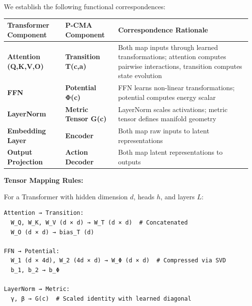 \documentclass[
  11pt,
  a4paper,
]{article}
\begin{document}
We establish the following functional correspondences:

\begin{longtable}[]{@{}
  >{\raggedright\arraybackslash}p{}
  >{\raggedright\arraybackslash}p{}
  >{\raggedright\arraybackslash}p{}@{}}
\toprule\noalign{}
\begin{minipage}[b]{\linewidth}\raggedright
Transformer Component
\end{minipage} & \begin{minipage}[b]{\linewidth}\raggedright
P-CMA Component
\end{minipage} & \begin{minipage}[b]{\linewidth}\raggedright
Correspondence Rationale
\end{minipage} \\
\midrule\noalign{}
\endhead
\bottomrule\noalign{}
\endlastfoot
\textbf{Attention (Q,K,V,O)} & \textbf{Transition T(c,a)} & Both map
inputs through learned transformations; attention computes pairwise
interactions, transition computes state evolution \\
\textbf{FFN} & \textbf{Potential Φ(c)} & FFN learns non-linear
transformations; potential computes energy scalar \\
\textbf{LayerNorm} & \textbf{Metric Tensor G(c)} & LayerNorm scales
activations; metric tensor defines manifold geometry \\
\textbf{Embedding Layer} & \textbf{Encoder} & Both map raw inputs to
latent representations \\
\textbf{Output Projection} & \textbf{Action Decoder} & Both map latent
representations to outputs \\
\end{longtable}

\textbf{Tensor Mapping Rules:}

For a Transformer with hidden dimension \(d\), heads \(h\), and layers
\(L\):

\begin{verbatim}
Attention → Transition:
  W_Q, W_K, W_V (d × d) → W_T (d × d)  # Concatenated
  W_O (d × d) → bias_T (d)
  
FFN → Potential:
  W_1 (d × 4d), W_2 (4d × d) → W_Φ (d × d)  # Compressed via SVD
  b_1, b_2 → b_Φ

LayerNorm → Metric:
  γ, β → G(c)  # Scaled identity with learned diagonal
\end{verbatim}
\end{document}
